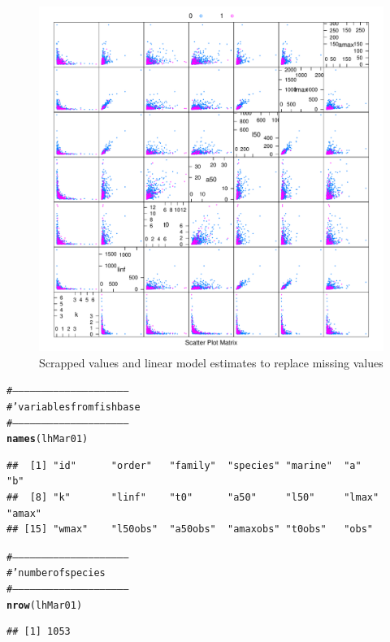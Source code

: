 \documentclass[a4paper]{article}\usepackage{graphicx, color}
\makeatletter
\def\maxwidth{ %
  \ifdim\Gin@nat@width>\linewidth
    \linewidth
  \else
    \Gin@nat@width
  \fi
}
\newcommand{\hlfunctioncall}[1]{\textcolor[rgb]{0.501960784313725,0,0.329411764705882}{\textbf{#1}}}%
\newcommand{\hlcomment}[1]{\textcolor[rgb]{0.180392156862745,0.6,0.341176470588235}{#1}}%
\newenvironment{kframe}{%
 \def\at@end@of@kframe{}%
 \ifinner\ifhmode%
  \def\at@end@of@kframe{\end{minipage}}%
  \begin{minipage}{\columnwidth}%
 \fi\fi%
 \def\FrameCommand##1{\hskip\@totalleftmargin \hskip-\fboxsep
 \colorbox{shadecolor}{##1}\hskip-\fboxsep
     \hskip-\linewidth \hskip-\@totalleftmargin \hskip\columnwidth}%
 \MakeFramed {\advance\hsize-\width
   \@totalleftmargin\z@ \linewidth\hsize
   \@setminipage}}%
 {\par\unskip\endMakeFramed%
 \at@end@of@kframe}
\newenvironment{knitrout}{}{} %
\makeatother
\begin{document}
\begin{knitrout}
\color{fgcolor}\begin{figure}[H]

\includegraphics[width=\maxwidth]{figure/unnamed-chunk-6} \caption[Scrapped values and linear model estimates to replace missing values]{Scrapped values and linear model estimates to replace missing values\label{fig:unnamed-chunk-6}}
\end{figure}


\end{knitrout}


\begin{knitrout}
\color{fgcolor}\begin{kframe}
\begin{alltt}
\hlcomment{# ------------------------------------------------------------}
\hlcomment{#' variables from fishbase}
\hlcomment{# ------------------------------------------------------------}
\hlfunctioncall{names}(lhMar01)
\end{alltt}
\begin{verbatim}
##  [1] "id"      "order"   "family"  "species" "marine"  "a"       "b"      
##  [8] "k"       "linf"    "t0"      "a50"     "l50"     "lmax"    "amax"   
## [15] "wmax"    "l50obs"  "a50obs"  "amaxobs" "t0obs"   "obs"
\end{verbatim}
\begin{alltt}
\hlcomment{# ------------------------------------------------------------}
\hlcomment{#' number of species}
\hlcomment{# ------------------------------------------------------------}
\hlfunctioncall{nrow}(lhMar01)
\end{alltt}
\begin{verbatim}
## [1] 1053
\end{verbatim}
\end{kframe}
\end{knitrout}
\end{document}
